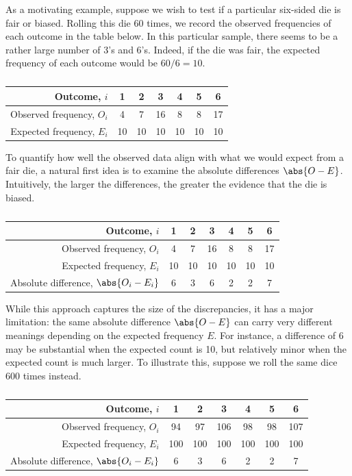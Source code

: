 As a motivating example, suppose we wish to test if a particular six-sided die is fair or biased. Rolling this die 60 times, we record the observed frequencies of each outcome in the table below. In this particular sample, there seems to be a rather large number of 3's and 6's. Indeed, if the die was fair, the expected frequency of each outcome would be $60/6 = 10$.

\begin{table}[H]
    \centering
    \begin{tabular}{|r|c|c|c|c|c|c|}
    \hline
    Outcome, $i$ & 1 & 2 & 3 & 4 & 5 & 6 \\ \hline
    Observed frequency, $O_i$ & 4 & 7 & 16 & 8 & 8 & 17 \\ \hline
    Expected frequency, $E_i$ & 10 & 10 & 10 & 10 & 10 & 10 \\ \hline
    \end{tabular}
    \caption{}
\end{table}

To quantify how well the observed data align with what we would expect from a fair die, a natural first idea is to examine the absolute differences $\abs{O-E}$. Intuitively, the larger the differences, the greater the evidence that the die is biased.

\begin{table}[H]
    \centering
    \begin{tabular}{|r|c|c|c|c|c|c|}
    \hline
    Outcome, $i$ & 1 & 2 & 3 & 4 & 5 & 6 \\ \hline
    Observed frequency, $O_i$ & 4 & 7 & 16 & 8 & 8 & 17 \\ \hline
    Expected frequency, $E_i$ & 10 & 10 & 10 & 10 & 10 & 10 \\ \hline
    Absolute difference, $\abs{O_i-E_i}$ & 6 & 3 & 6 & 2 & 2 & 7 \\ \hline
    \end{tabular}
    \caption{}
\end{table}

While this approach captures the size of the discrepancies, it has a major limitation: the same absolute difference $\abs{O-E}$ can carry very different meanings depending on the expected frequency $E$. For instance, a difference of 6 may be substantial when the expected count is 10, but relatively minor when the expected count is much larger. To illustrate this, suppose we roll the same dice 600 times instead.

\begin{table}[H]
    \centering
    \begin{tabular}{|r|c|c|c|c|c|c|}
    \hline
    Outcome, $i$ & 1 & 2 & 3 & 4 & 5 & 6 \\ \hline
    Observed frequency, $O_i$ & 94 & 97 & 106 & 98 & 98 & 107 \\ \hline
    Expected frequency, $E_i$ & 100 & 100 & 100 & 100 & 100 & 100 \\ \hline
    Absolute difference, $\abs{O_i-E_i}$ & 6 & 3 & 6 & 2 & 2 & 7 \\ \hline
    \end{tabular}
    \caption{}
\end{table}


